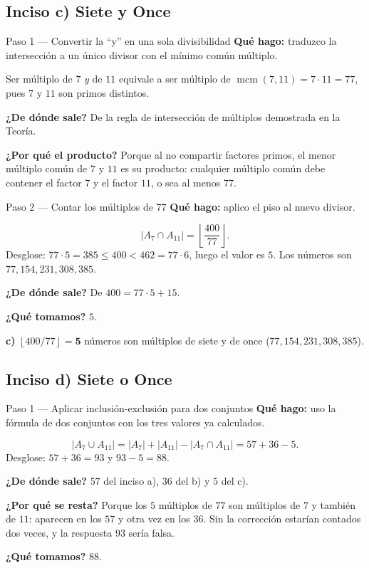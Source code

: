 \documentclass[11pt]{article}
\begin{document}
\subsection*{Inciso c) Siete y Once}

\begin{paso}{Paso 1 --- Convertir la ``y'' en una sola divisibilidad}
\textbf{Qué hago:} traduzco la intersección a un único divisor con el mínimo común múltiplo.

Ser múltiplo de $7$ \emph{y} de $11$ equivale a ser múltiplo de $\operatorname{mcm}(7,11) = 7\cdot 11 = 77$, pues $7$ y $11$ son primos distintos.

\textbf{¿De dónde sale?} De la regla de intersección de múltiplos demostrada en la Teoría.

\textbf{¿Por qué el producto?} Porque al no compartir factores primos, el menor múltiplo común de $7$ y $11$ es su producto: cualquier múltiplo común debe contener el factor $7$ y el factor $11$, o sea al menos $77$.
\end{paso}

\begin{paso}{Paso 2 --- Contar los múltiplos de 77}
\textbf{Qué hago:} aplico el piso al nuevo divisor.

\[
|A_7\cap A_{11}| = \left\lfloor \frac{400}{77}\right\rfloor .
\]
Desglose: $77\cdot 5 = 385 \le 400 < 462 = 77\cdot 6$, luego el valor es $5$. Los números son $77,154,231,308,385$.

\textbf{¿De dónde sale?} De $400 = 77\cdot 5 + 15$.

\textbf{¿Qué tomamos?} $5$.
\end{paso}

\begin{resp}
\textbf{c)} $\left\lfloor 400/77\right\rfloor = \mathbf{5}$ números son múltiplos de siete y de once ($77,154,231,308,385$).
\end{resp}

\subsection*{Inciso d) Siete o Once}

\begin{paso}{Paso 1 --- Aplicar inclusión-exclusión para dos conjuntos}
\textbf{Qué hago:} uso la fórmula de dos conjuntos con los tres valores ya calculados.

\[
|A_7\cup A_{11}| = |A_7|+|A_{11}|-|A_7\cap A_{11}| = 57+36-5 .
\]
Desglose: $57+36 = 93$ y $93-5 = 88$.

\textbf{¿De dónde sale?} $57$ del inciso a), $36$ del b) y $5$ del c).

\textbf{¿Por qué se resta?} Porque los $5$ múltiplos de $77$ son múltiplos de $7$ y también de $11$: aparecen en los $57$ y otra vez en los $36$. Sin la corrección estarían contados dos veces, y la respuesta $93$ sería falsa.

\textbf{¿Qué tomamos?} $88$.
\end{paso}
\end{document}
